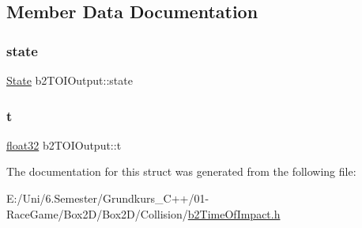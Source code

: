 \subsection{Member Data Documentation}
\mbox{\label{structb2_t_o_i_output_aaacbf28f437b965ffecabf1407a77915}} 
\subsubsection{\texorpdfstring{state}{state}}
{\footnotesize\ttfamily \mbox{\hyperlink{structb2_t_o_i_output_a12c3cf4dc0551f5c8249dc1dd867959a}{State}} b2\+T\+O\+I\+Output\+::state}

\mbox{\label{structb2_t_o_i_output_a94f8b756e060892226ec006db4be7ee3}} 
\subsubsection{\texorpdfstring{t}{t}}
{\footnotesize\ttfamily \mbox{\hyperlink{b2_settings_8h_aacdc525d6f7bddb3ae95d5c311bd06a1}{float32}} b2\+T\+O\+I\+Output\+::t}



The documentation for this struct was generated from the following file\+:\begin{DoxyCompactItemize}
\item 
E\+:/\+Uni/6.\+Semester/\+Grundkurs\+\_\+\+C++/01-\/\+Race\+Game/\+Box2\+D/\+Box2\+D/\+Collision/\mbox{\hyperlink{b2_time_of_impact_8h}{b2\+Time\+Of\+Impact.\+h}}\end{DoxyCompactItemize}
